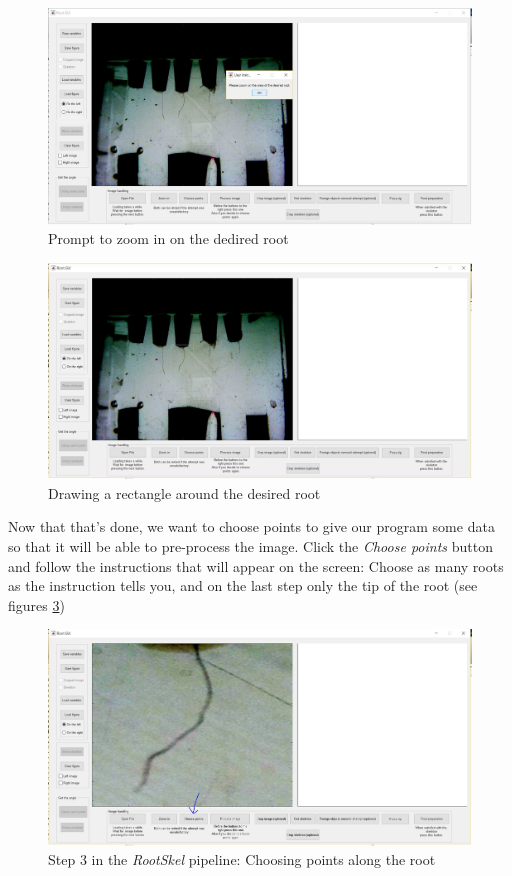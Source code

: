 \begin{figure}[H]
 	\centering
 	\includegraphics[width=\textwidth]{../Figures/manual/step4.jpg}
 	\caption{Prompt to zoom in on the dedired root}
 	\label{fig:img7}
\end{figure} 	
 
\begin{figure}[H]
  	\centering
  	\includegraphics[width=\textwidth]{../Figures/manual/step5.jpg}
  	\caption{Drawing a rectangle around the desired root}
  	\label{fig:img8}
\end{figure}
  
Now that that's done, we want to choose points to give our program some data so that it will be able to pre-process the image.
Click the \textit{Choose points} button and follow the instructions that will appear on the screen: Choose as many roots as the instruction tells you, and on the last step only the tip of the root (see figures \ref{fig:img9})

\begin{figure}[H]
	\centering
	\includegraphics[width=\textwidth]{../Figures/manual/step6.jpg}
	\caption{Step 3 in the \textit{RootSkel} pipeline: Choosing points along the root}
	\label{fig:img9}
\end{figure}

